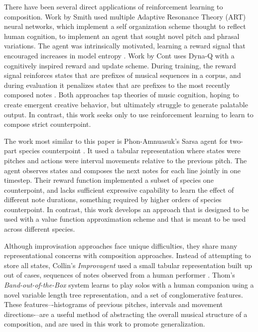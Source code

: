 \documentclass{article}
\begin{document}
\begin{multicols}{2}
    There have been several direct applications of reinforcement learning to composition. Work by Smith used multiple Adaptive Resonance Theory (ART) neural networks, which implement a self organization scheme thought to reflect human cognition, to implement an agent that sought novel pitch and phrasal variations. The agent was intrinsically motivated, learning a reward signal that encouraged increases in model entropy \cite{Smith2012}. Work by Cont uses Dyna-Q with a cognitively inspired reward and update scheme. During training, the reward signal reinforces states that are prefixes of musical sequences in a corpus, and during evaluation it penalizes states that are prefixes to the most recently composed notes \cite{cont:hal-00839073}. Both approaches tap theories of music cognition, hoping to create emergent creative behavior, but ultimately struggle to generate palatable output. In contrast, this work seeks only to use reinforcement learning to learn to compose strict counterpoint.

	The work most similar to this paper is Phon-Amnuasuk's Sarsa agent for two-part species counterpoint \cite{Phon-Amnuaisuk2009}. It used a tabular representation where states were pitches and actions were interval movements relative to the previous pitch. The agent observes states and composes the next notes for each line jointly in one timestep. Their reward function implemented a subset of species one counterpoint, and lacks sufficient expressive capability to learn the effect of different note durations, something required by higher orders of species counterpoint. In contrast, this work develops an approach that is designed to be used with a value function approximation scheme and that is meant to be used across different species.

	Although improvisation approaches face unique difficulties, they share many representational concerns with composition approaches. Instead of attempting to store all states, Collin's \textit{Improvagent} used a small tabular representation built up out of cases, sequences of notes observed from a human performer \cite{collins2008reinforcement}. Thom's \textit{Band-out-of-the-Box} system learns to play solos with a human companion using a novel variable length tree representation, and a set of conglomerative features. These features–-histograms of previous pitches, intervals and movement directions-–are a useful method of abstracting the overall musical structure of a composition, and are used in this work to promote generalization.


\end{multicols}
\end{document}
